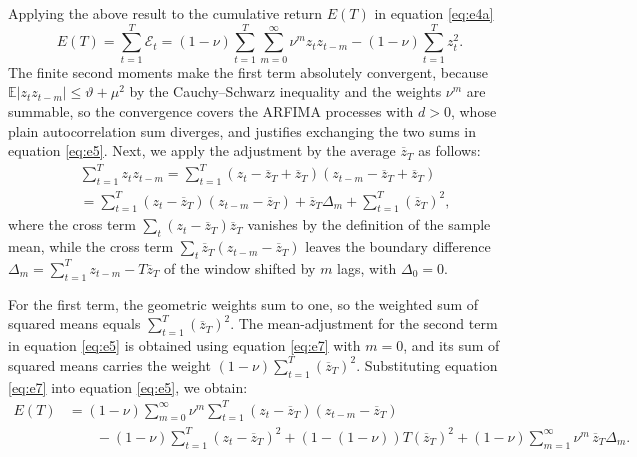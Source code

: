 \documentclass[hidelinks]{siamonline250211}
\begin{document}
Applying the above result to the cumulative return $E(T)$ in equation \eqref{eq:e4a}
\begin{equation} \label{eq:e5} 
	E(T) = \sum^{T}_{t=1}  \mathcal{E}_{t}   =   \left(1-\nu \right)   \sum^{T}_{t=1}\sum^{\infty}_{m=0} \nu^{m} z_{t} z_{t-m} - \left(1-\nu \right)  \sum^{T}_{t=1} z^{2}_{t}.   
\end{equation}
The finite second moments make the first term absolutely convergent, because $\mathbb{E}\left|z_{t} z_{t-m}\right| \leq \vartheta + \mu^{2}$ by the Cauchy--Schwarz inequality and the weights $\nu^{m}$ are summable, so the convergence covers the ARFIMA processes with $d>0$, whose plain autocorrelation sum diverges, and justifies exchanging the two sums in equation \eqref{eq:e5}. Next, we apply the adjustment by the average $\overline{z}_{T}$ as follows:
\begin{equation} \label{eq:e7} 
	\begin{split}
		& \sum^{T}_{t=1} z_{t} z_{t-m}  = \sum^{T}_{t=1} \left( z_{t} -\overline{z}_{T}+\overline{z}_{T}\right) \left(z_{t-m} -\overline{z}_{T}+\overline{z}_{T}\right)\\
		& = \sum^{T}_{t=1} \left( z_{t} -\overline{z}_{T} \right) \left(z_{t-m} -\overline{z}_{T} \right)  + \overline{z}_{T}\Delta_{m} +\sum^{T}_{t=1} (\overline{z}_{T})^{2},
	\end{split}
\end{equation}
where the cross term $\sum_{t}\left(z_{t}-\overline{z}_{T}\right)\overline{z}_{T}$ vanishes by the definition of the sample mean, while the cross term $\sum_{t}\overline{z}_{T}\left(z_{t-m}-\overline{z}_{T}\right)$ leaves the boundary difference $\Delta_{m}=\sum^{T}_{t=1} z_{t-m} - T\overline{z}_{T}$ of the window shifted by $m$ lags, with $\Delta_{0}=0$.

For the first term, the geometric weights sum to one, so the weighted sum of squared means equals $\sum^{T}_{t=1} (\overline{z}_{T})^{2}$. The mean-adjustment for the second term in equation \eqref{eq:e5} is obtained using equation \eqref{eq:e7} with $m=0$, and its sum of squared means carries the weight $\left(1-\nu\right) \sum^{T}_{t=1} (\overline{z}_{T})^{2}$. Substituting equation \eqref{eq:e7} into equation \eqref{eq:e5}, we obtain:
\begin{equation} \label{eq:e10} 
	\begin{split}
		E(T) & =   \left(1-\nu \right)  \sum^{\infty}_{m=0} \nu^{m} \sum^{T}_{t=1}  \left( z_{t} -\overline{z}_{T} \right) \left(z_{t-m} -\overline{z}_{T} \right) \\
		& \qquad -  \left(1-\nu \right) \sum^{T}_{t=1} \left(z_{t}-\overline{z}_{T} \right)^{2} +  \left( 1-(1-\nu) \right)T(\overline{z}_{T})^{2} + \left(1-\nu \right) \sum^{\infty}_{m=1} \nu^{m}\, \overline{z}_{T}\Delta_{m}.
	\end{split}
\end{equation}
\end{document}
